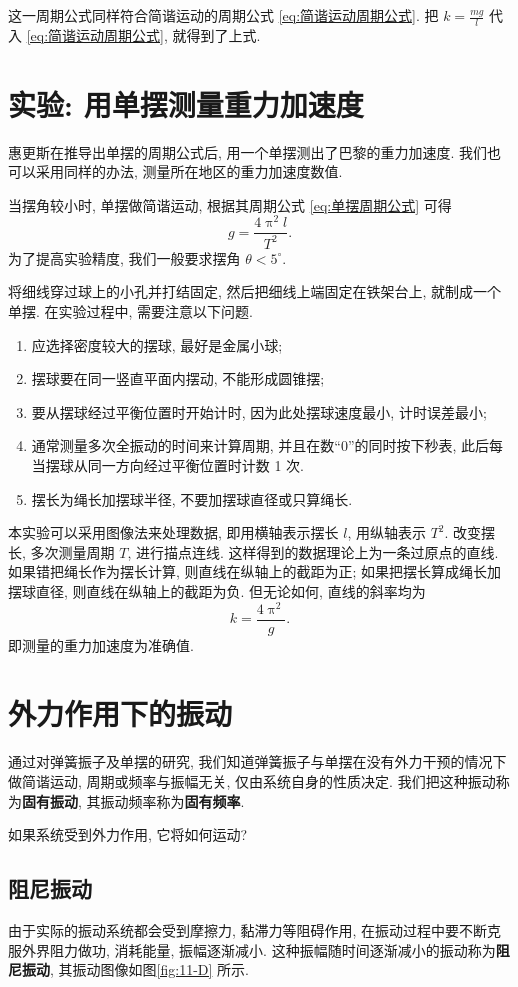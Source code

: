 \documentclass[UTF8,openany,fontset=fandol]{ctexbook}
\theoremstyle{chinesetextbook}
\begin{document}
这一周期公式同样符合简谐运动的周期公式 \eqref{eq:简谐运动周期公式}. 把 $\displaystyle k=\frac{mg}{l}$ 代入 \eqref{eq:简谐运动周期公式}, 就得到了上式.
\section{实验: 用单摆测量重力加速度}
惠更斯在推导出单摆的周期公式后, 用一个单摆测出了巴黎的重力加速度. 我们也可以采用同样的办法, 测量所在地区的重力加速度数值.

当摆角较小时, 单摆做简谐运动, 根据其周期公式 \eqref{eq:单摆周期公式} 可得
\[
g=\frac{4\uppi^2l}{T^2}.
\]
为了提高实验精度, 我们一般要求摆角 $\theta<5^\circ$.

将细线穿过球上的小孔并打结固定, 然后把细线上端固定在铁架台上, 就制成一个单摆. 在实验过程中, 需要注意以下问题.
\begin{enumerate}
\item 应选择密度较大的摆球, 最好是金属小球;
\item 摆球要在同一竖直平面内摆动, 不能形成圆锥摆;
\item 要从摆球经过平衡位置时开始计时, 因为此处摆球速度最小, 计时误差最小;
\item 通常测量多次全振动的时间来计算周期, 并且在数“0”的同时按下秒表, 此后每当摆球从同一方向经过平衡位置时计数 1 次.
\item 摆长为绳长加摆球半径, 不要加摆球直径或只算绳长.
\end{enumerate}

本实验可以采用图像法来处理数据, 即用横轴表示摆长 $l$, 用纵轴表示 $T^2$. 改变摆长, 多次测量周期 $T$, 进行描点连线. 这样得到的数据理论上为一条过原点的直线. 如果错把绳长作为摆长计算, 则直线在纵轴上的截距为正; 如果把摆长算成绳长加摆球直径, 则直线在纵轴上的截距为负. 但无论如何, 直线的斜率均为
\[
k=\frac{4\uppi^2}{g}.
\]
即测量的重力加速度为准确值.
\section{外力作用下的振动}
通过对弹簧振子及单摆的研究, 我们知道弹簧振子与单摆在没有外力干预的情况下做简谐运动, 周期或频率与振幅无关, 仅由系统自身的性质决定. 我们把这种振动称为\textbf{固有振动}, 其振动频率称为\textbf{固有频率}.

如果系统受到外力作用, 它将如何运动?
\subsection{阻尼振动}
由于实际的振动系统都会受到摩擦力, 黏滞力等阻碍作用, 在振动过程中要不断克服外界阻力做功, 消耗能量, 振幅逐渐减小. 这种振幅随时间逐渐减小的振动称为\textbf{阻尼振动}, 其振动图像如图\ref{fig:11-D} 所示.
\end{document}
